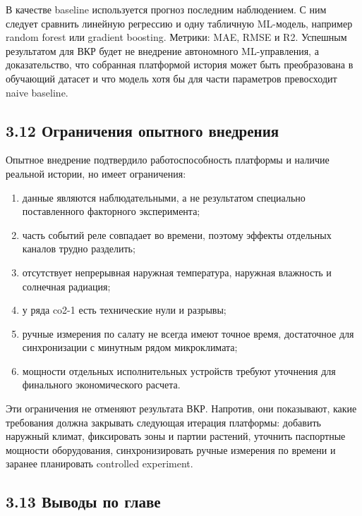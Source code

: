 \documentclass[a4paper,14pt]{extarticle}
\renewcommand{\texttt}[1]{\textnormal{#1}}
\providecommand{\tightlist}{%
  \setlength{\itemsep}{0pt}\setlength{\parskip}{0pt}}
\begin{document}
В качестве baseline используется прогноз последним наблюдением. С ним
следует сравнить линейную регрессию и одну табличную ML-модель, например
random forest или gradient boosting. Метрики: MAE, RMSE и R2. Успешным
результатом для ВКР будет не внедрение автономного ML-управления, а
доказательство, что собранная платформой история может быть
преобразована в обучающий датасет и что модель хотя бы для части
параметров превосходит naive baseline.

\subsection{3.12 Ограничения опытного
внедрения}\label{ux43eux433ux440ux430ux43dux438ux447ux435ux43dux438ux44f-ux43eux43fux44bux442ux43dux43eux433ux43e-ux432ux43dux435ux434ux440ux435ux43dux438ux44f}

Опытное внедрение подтвердило работоспособность платформы и наличие
реальной истории, но имеет ограничения:

\begin{enumerate}
\def\labelenumi{\arabic{enumi})}
\tightlist
\item
  данные являются наблюдательными, а не результатом специально
  поставленного факторного эксперимента;
\item
  часть событий реле совпадает во времени, поэтому эффекты отдельных
  каналов трудно разделить;
\item
  отсутствует непрерывная наружная температура, наружная влажность и
  солнечная радиация;
\item
  у ряда \texttt{co2-1} есть технические нули и разрывы;
\item
  ручные измерения по салату не всегда имеют точное время, достаточное
  для синхронизации с минутным рядом микроклимата;
\item
  мощности отдельных исполнительных устройств требуют уточнения для
  финального экономического расчета.
\end{enumerate}

Эти ограничения не отменяют результата ВКР. Напротив, они показывают,
какие требования должна закрывать следующая итерация платформы: добавить
наружный климат, фиксировать зоны и партии растений, уточнить паспортные
мощности оборудования, синхронизировать ручные измерения по времени и
заранее планировать controlled experiment.

\subsection{3.13 Выводы по
главе}\label{ux432ux44bux432ux43eux434ux44b-ux43fux43e-ux433ux43bux430ux432ux435-1}
\end{document}
